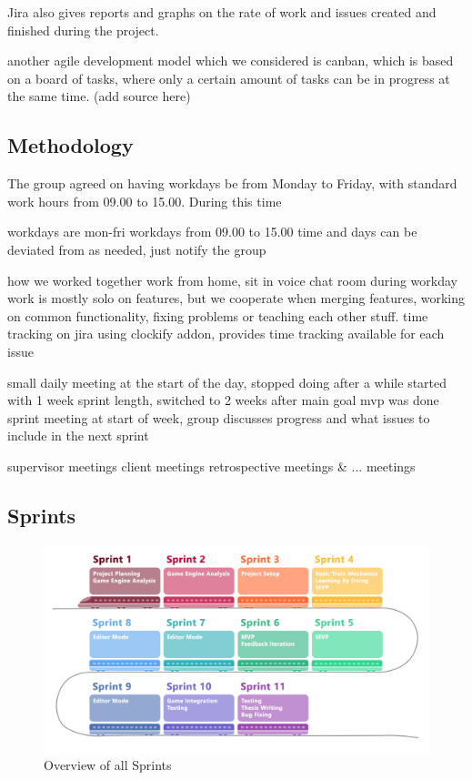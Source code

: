 Jira also gives reports and graphs on the rate of work and issues created and finished during the project. 



another agile development model which we considered is canban, which is based on a board of tasks, where only a certain amount of tasks can be in progress at the same time. (add source here) 


\subsection{Methodology}


The group agreed on having workdays be from Monday to Friday, with standard work hours from 09.00 to 15.00. During this time 

workdays are mon-fri
workdays from 09.00 to 15.00 
time and days can be deviated from as needed, just notify the group

how we worked together
work from home, sit in voice chat room during workday
work is mostly solo on features, but we cooperate when merging features, working on common functionality, fixing problems or teaching each other stuff.
time tracking on jira using clockify addon, provides time tracking available for each issue


small daily meeting at the start of the day, stopped doing after a while
started with 1 week sprint length, switched to 2 weeks after main goal mvp was done
sprint meeting at start of week, group discusses progress and what issues to include in the next sprint

supervisor meetings
client meetings
retrospective meetings \& ... meetings 


\subsection{Sprints}

\begin{figure}[H]
    \centering
    \vspace{12pt}
    \includegraphics[width=14cm]{figures/ExampleSprintOverview.png}
    \caption{Overview of all Sprints}
    \label{sprint_overview_img}
\end{figure} 

